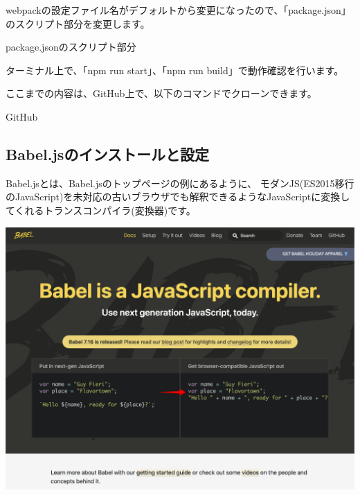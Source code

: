 webpackの設定ファイル名がデフォルトから変更になったので、「package.json」のスクリプト部分を変更します。

\def\startercodeblockfontsize{}
\begin{starterprogram}[]{package.jsonのスクリプト部分}\end{starterprogram}

ターミナル上で、「npm run start」、「npm run build」で動作確認を行います。

\begin{starternote}[]{}

ここまでの内容は、GitHub上で、以下のコマンドでクローンできます。

\def\startercodeblockfontsize{}
\begin{starterterminal}[]{GitHub}\end{starterterminal}
\end{starternote}

\subsection{Babel.jsのインストールと設定}
\keeplastskip{
  \label{sec:2-2-6}
  \label{sec04-babeljs}
  \par\nobreak
}

Babel.jsとは、Babel.jsのトップページの例にあるように、
モダンJS(ES2015移行のJavaScript)を未対応の古いブラウザでも解釈できるようなJavaScriptに変換してくれるトランスコンパイラ(変換器)です。

\begin{reviewimage}%
\includegraphics[width=1.0\maxwidth]{./images/02-create-react-app/babel01.png}%
\label{image:02-create-react-app:babel01}
\end{reviewimage}

